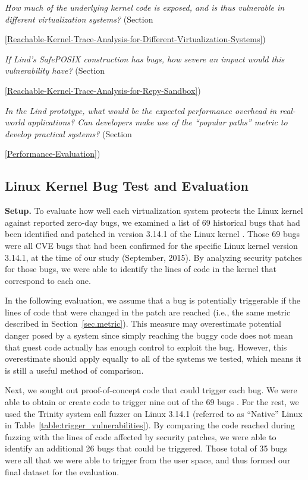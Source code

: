 \textit{How much of the underlying kernel code is exposed, and is thus
vulnerable in different virtualization systems?}
(Section~{{\ref{Reachable-Kernel-Trace-Analysis-for-Different-Virtualization-Systems}})

\textit{If Lind's SafePOSIX construction has bugs, how severe an impact would
this vulnerability have?}
(Section~{{\ref{Reachable-Kernel-Trace-Analysis-for-Repy-Sandbox}})

\textit{In the Lind prototype, what would be the expected performance overhead in
real-world applications? Can developers make use of the ``popular paths'' metric to develop 
practical systems?}
(Section~{{\ref{Performance-Evaluation}})

\subsection{Linux Kernel Bug Test and Evaluation}
\label{Linux-Kernel-Bug-Test-and-Evaluation}


\noindent
\textbf{Setup.}
To evaluate how well each virtualization system protects the Linux kernel
against reported zero-day bugs,
we examined a list of 69 historical bugs that had been identified and patched in version 3.14.1 of the Linux kernel \cite{CVE-Datasource}. 
Those 69 bugs were all CVE \cite{CVE} bugs that had been confirmed for the specific Linux kernel version 3.14.1, at the time of our study (September, 2015). 
By analyzing security patches for those bugs,
we were able to identify the lines of code in the kernel that correspond to each one.

In the following evaluation, we assume that a bug is potentially triggerable if the lines of code that were changed in the patch are reached
(i.e., the same metric described in Section~\ref{sec.metric}).
This measure may overestimate potential danger posed by a system since simply reaching the buggy code does not mean that guest code
actually has enough control to exploit the bug.
However, this overestimate should apply equally to all of the systems we tested, which means it is still a useful method of comparison.

Next, we sought out proof-of-concept code that could trigger each bug.
We were able to obtain or create code to trigger nine out of the 69 bugs \cite{Exploit-Database}.
For the rest, we used the Trinity system call fuzzer
\cite{Trinity} on Linux 3.14.1 (referred to as ``Native'' Linux in Table~\ref{table:trigger_vulnerabilities}).
By comparing the code reached during fuzzing with the lines of code affected by security patches,
we were able to identify an additional 26 bugs that could be triggered. Those total of 35 bugs were all that we were able to trigger from the user space, 
and thus formed our final dataset for the evaluation. 

}}}
